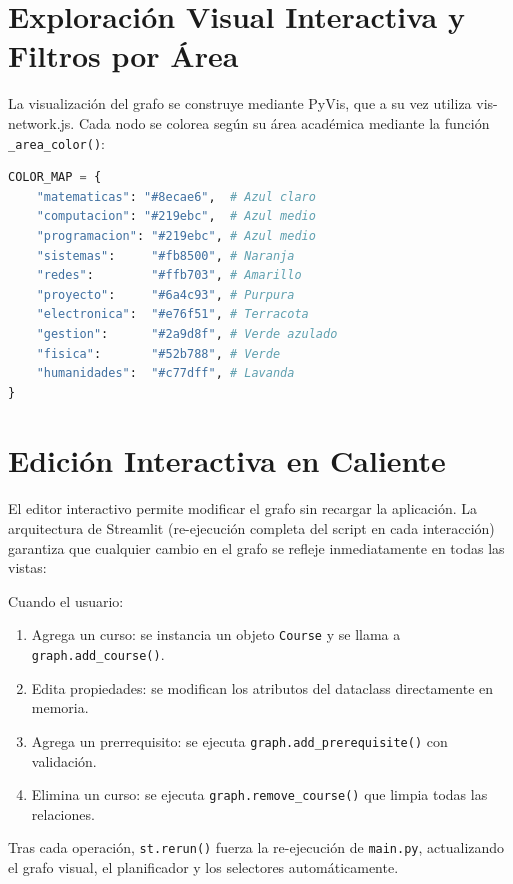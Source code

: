 \documentclass[12pt]{report}
\begin{document}
\section{Exploración Visual Interactiva y Filtros por Área}

La visualización del grafo se construye mediante PyVis, que a su vez utiliza vis-network.js. Cada nodo se colorea según su área académica mediante la función \texttt{\_area\_color()}:

\begin{lstlisting}[caption=Esquema de colores por área académica, label=lst:colors, language=Python]
COLOR_MAP = {
    "matematicas": "#8ecae6",  # Azul claro
    "computacion": "#219ebc",  # Azul medio
    "programacion": "#219ebc", # Azul medio
    "sistemas":     "#fb8500", # Naranja
    "redes":        "#ffb703", # Amarillo
    "proyecto":     "#6a4c93", # Purpura
    "electronica":  "#e76f51", # Terracota
    "gestion":      "#2a9d8f", # Verde azulado
    "fisica":       "#52b788", # Verde
    "humanidades":  "#c77dff", # Lavanda
}
\end{lstlisting}

\section{Edición Interactiva en Caliente}

El editor interactivo permite modificar el grafo sin recargar la aplicación. La arquitectura de Streamlit (re-ejecución completa del script en cada interacción) garantiza que cualquier cambio en el grafo se refleje inmediatamente en todas las vistas:

\label{sec:hot-editing}
Cuando el usuario:
\begin{enumerate}
    \item Agrega un curso: se instancia un objeto \texttt{Course} y se llama a \texttt{graph.add\_course()}.
    \item Edita propiedades: se modifican los atributos del dataclass directamente en memoria.
    \item Agrega un prerrequisito: se ejecuta \texttt{graph.add\_prerequisite()} con validación.
    \item Elimina un curso: se ejecuta \texttt{graph.remove\_course()} que limpia todas las relaciones.
\end{enumerate}

Tras cada operación, \texttt{st.rerun()} fuerza la re-ejecución de \texttt{main.py}, actualizando el grafo visual, el planificador y los selectores automáticamente.
\end{document}
